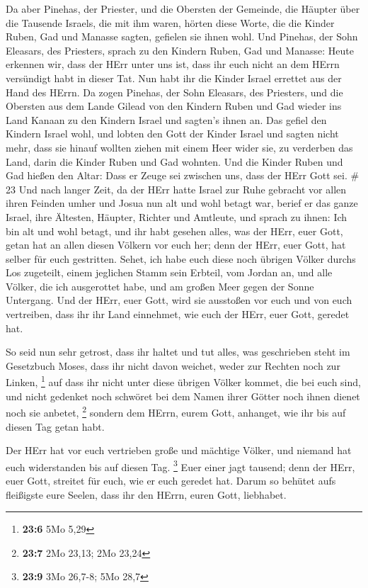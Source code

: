  Da aber Pinehas, der Priester, und die Obersten der
Gemeinde, die Häupter über die Tausende Israels, die mit ihm waren,
hörten diese Worte, die die Kinder Ruben, Gad und Manasse sagten,
gefielen sie ihnen wohl.  Und Pinehas, der Sohn Eleasars,
des Priesters, sprach zu den Kindern Ruben, Gad und Manasse: Heute
erkennen wir, dass der HErr unter uns ist, dass ihr euch nicht an dem
HErrn versündigt habt in dieser Tat. Nun habt ihr die Kinder Israel
errettet aus der Hand des HErrn.  Da zogen Pinehas, der
Sohn Eleasars, des Priesters, und die Obersten aus dem Lande Gilead von
den Kindern Ruben und Gad wieder ins Land Kanaan zu den Kindern Israel
und sagten's ihnen an.  Das gefiel den Kindern Israel wohl,
und lobten den Gott der Kinder Israel und sagten nicht mehr, dass sie
hinauf wollten ziehen mit einem Heer wider sie, zu verderben das Land,
darin die Kinder Ruben und Gad wohnten.  Und die Kinder
Ruben und Gad hießen den Altar: Dass er Zeuge sei zwischen uns, dass der
HErr Gott sei. \# 23  Und nach langer Zeit, da der HErr
hatte Israel zur Ruhe gebracht vor allen ihren Feinden umher und Josua
nun alt und wohl betagt war,  berief er das ganze Israel,
ihre Ältesten, Häupter, Richter und Amtleute, und sprach zu ihnen: Ich
bin alt und wohl betagt,  und ihr habt gesehen alles, was
der HErr, euer Gott, getan hat an allen diesen Völkern vor euch her;
denn der HErr, euer Gott, hat selber für euch gestritten. 
Sehet, ich habe euch diese noch übrigen Völker durchs Los zugeteilt,
einem jeglichen Stamm sein Erbteil, vom Jordan an, und alle Völker, die
ich ausgerottet habe, und am großen Meer gegen der Sonne Untergang.
 Und der HErr, euer Gott, wird sie ausstoßen vor euch und
von euch vertreiben, dass ihr ihr Land einnehmet, wie euch der HErr,
euer Gott, geredet hat.

 So seid nun sehr getrost, dass ihr haltet und tut alles,
was geschrieben steht im Gesetzbuch Moses, dass ihr nicht davon weichet,
weder zur Rechten noch zur Linken, \footnote{\textbf{23:6} 5Mo 5,29}
 auf dass ihr nicht unter diese übrigen Völker kommet, die
bei euch sind, und nicht gedenket noch schwöret bei dem Namen ihrer
Götter noch ihnen dienet noch sie anbetet, \footnote{\textbf{23:7} 2Mo
  23,13; 2Mo 23,24}  sondern dem HErrn, eurem Gott,
anhanget, wie ihr bis auf diesen Tag getan habt.

 Der HErr hat vor euch vertrieben große und mächtige Völker,
und niemand hat euch widerstanden bis auf diesen Tag. \footnote{\textbf{23:9}
  3Mo 26,7-8; 5Mo 28,7}  Euer einer jagt tausend; denn der
HErr, euer Gott, streitet für euch, wie er euch geredet hat.
 Darum so behütet aufs fleißigste eure Seelen, dass ihr den
HErrn, euren Gott, liebhabet.

